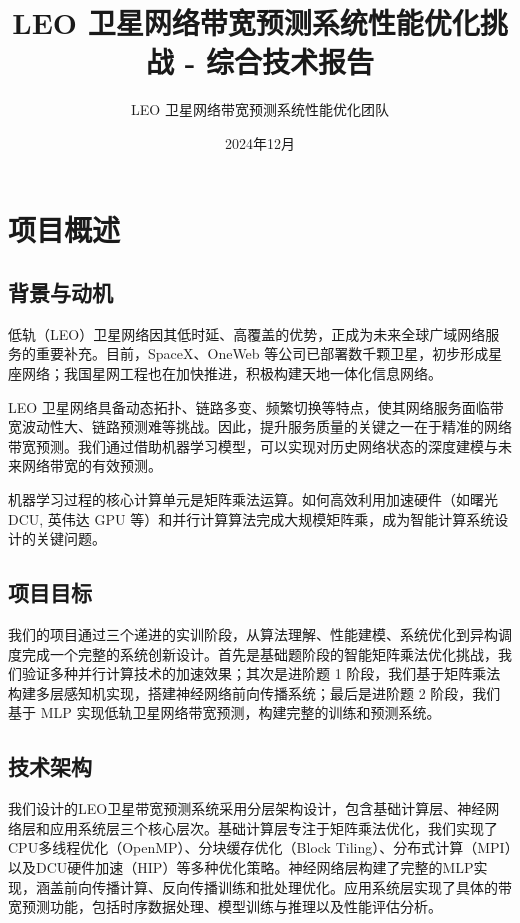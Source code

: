 \documentclass[12pt,a4paper]{article}
\title{LEO 卫星网络带宽预测系统性能优化挑战 - 综合技术报告}
\author{LEO 卫星网络带宽预测系统性能优化团队}
\date{2024年12月}
\begin{document}
\maketitle

\tableofcontents
\newpage

\section{项目概述}

\subsection{背景与动机}

低轨（LEO）卫星网络因其低时延、高覆盖的优势，正成为未来全球广域网络服务的重要补充。目前，SpaceX、OneWeb 等公司已部署数千颗卫星，初步形成星座网络；我国星网工程也在加快推进，积极构建天地一体化信息网络。

LEO 卫星网络具备动态拓扑、链路多变、频繁切换等特点，使其网络服务面临带宽波动性大、链路预测难等挑战。因此，提升服务质量的关键之一在于精准的网络带宽预测。我们通过借助机器学习模型，可以实现对历史网络状态的深度建模与未来网络带宽的有效预测。

机器学习过程的核心计算单元是矩阵乘法运算。如何高效利用加速硬件（如曙光 DCU, 英伟达 GPU 等）和并行计算算法完成大规模矩阵乘，成为智能计算系统设计的关键问题。

\subsection{项目目标}

我们的项目通过三个递进的实训阶段，从算法理解、性能建模、系统优化到异构调度完成一个完整的系统创新设计。首先是基础题阶段的智能矩阵乘法优化挑战，我们验证多种并行计算技术的加速效果；其次是进阶题 1 阶段，我们基于矩阵乘法构建多层感知机实现，搭建神经网络前向传播系统；最后是进阶题 2 阶段，我们基于 MLP 实现低轨卫星网络带宽预测，构建完整的训练和预测系统。

\subsection{技术架构}

我们设计的LEO卫星带宽预测系统采用分层架构设计，包含基础计算层、神经网络层和应用系统层三个核心层次。基础计算层专注于矩阵乘法优化，我们实现了CPU多线程优化（OpenMP）、分块缓存优化（Block Tiling）、分布式计算（MPI）以及DCU硬件加速（HIP）等多种优化策略。神经网络层构建了完整的MLP实现，涵盖前向传播计算、反向传播训练和批处理优化。应用系统层实现了具体的带宽预测功能，包括时序数据处理、模型训练与推理以及性能评估分析。
\end{document}
